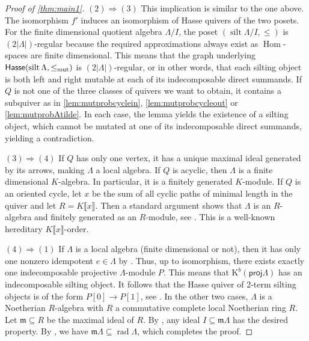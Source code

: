 \documentclass[11pt]{amsart}
\newcommand{\proj}{\mathsf{proj}}
\newcommand{\Hasse}{\mathsf{Hasse}}
\newcommand{\K}{\mathrm{K}}
\DeclareMathOperator{\Hom}{\mathrm{Hom}}
\DeclareMathOperator{\rad}{\mathrm{rad}}
\DeclareMathOperator{\silt}{\mathrm{silt}}
\theoremstyle{definition}
\begin{document}
\begin{proof}[Proof of \cref{thm:main1}]
     $(2) \Rightarrow (3)$ This implication is similar to the one above. The isomorphism $f'$ induces an isomorphism of Hasse quivers of the two posets. For the finite dimensional quotient algebra $\Lambda/I$, the poset $(\silt \Lambda/I, \leq)$ is $(2 | \Lambda| )$-regular because the required approximations always exist as $\Hom$-spaces are finite dimensional. This means that the graph underlying $\Hasse(\silt \Lambda, \leq_{\textnormal{mut}})$ is $(2 |\Lambda|)$-regular, or in other words, that each silting object is both left and right mutable at each of its indecomposable direct summands. If $Q$ is not one of the three classes of quivers we want to obtain, it contains a subquiver as in \cref{lem:mutprobcyclein}, \cref{lem:mutprobcycleout} or \cref{lem:mutprobAtilde}. In each case, the lemma yields the existence of a silting object, which cannot be mutated at one of its indecomposable direct summands, yielding a contradiction.
     
     $(3) \Rightarrow (4)$ If $Q$ has only one vertex, it has a unique maximal ideal generated by its arrows, making $\Lambda$ a local algebra. If $Q$ is acyclic, then $\Lambda$ is a finite dimensional $K$-algebra. In particular, it is a finitely generated $K$-module. If $Q$ is an oriented cycle, let $x$ be the sum of all cyclic paths of minimal length in the quiver and let $R = K\llbracket x \rrbracket$. Then a standard argument shows that $\Lambda$ is an $R$-algebra and finitely generated as an $R$-module, see \cite[Thm. 3.2.8]{Ricke}. This is a well-known hereditary $K \llbracket x \rrbracket$-order. 
     
     $(4) \Rightarrow (1)$ If $\Lambda$ is a local algebra (finite dimensional or not), then it has only one nonzero idempotent $e \in \Lambda$ by \cite[Prop. 19.2]{Lam2001}. Thus, up to isomorphism, there exists exactly one indecomposable projective $\Lambda$-module $P$. This means that $\K^b(\proj \Lambda)$ has an indecomposable silting object. It follows that the Hasse quiver of 2-term silting objects is of the form $P[0] \to P[1]$, see \cite[Thm. 2.26]{Aihara_2012}. In the other two cases, $\Lambda$ is a Noetherian $R$-algebra with $R$ a commutative complete local Noetherian ring $R$. Let $\mathfrak{m} \subseteq R$ be the maximal ideal of $R$. By \cite[Thm. 4.3]{Kimura2024}, any ideal $I \subseteq \mathfrak{m} \Lambda$ has the desired property. By \cite[Prop. 5.22]{CurtisReiner1981}, we have $\mathfrak{m} \Lambda \subseteq \rad \Lambda$, which completes the proof. 
     

\end{proof}
\end{document}
